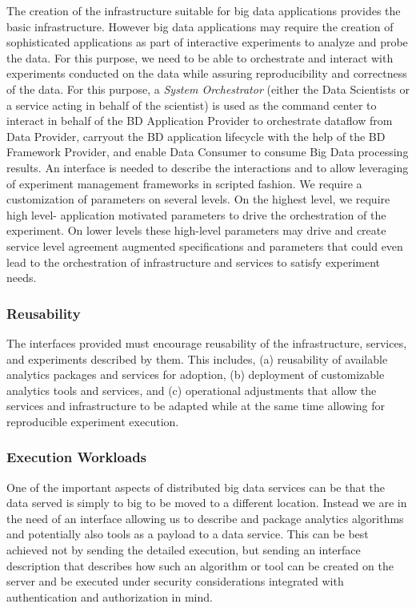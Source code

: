 \documentclass[10pt]{article}
\begin{document}
The creation of the infrastructure suitable for big data applications
provides the basic infrastructure. However big data applications may
require the creation of sophisticated applications as part of
interactive experiments to analyze and probe the data. For this
purpose, we need to be able to orchestrate and interact with
experiments conducted on the data while assuring reproducibility and
correctness of the data. For this purpose, a {\it System Orchestrator}
(either the Data Scientists or a service acting in behalf of the
scientist) is used as the command center to interact in behalf of the
BD Application Provider to orchestrate dataflow from Data Provider,
carryout the BD application lifecycle with the help of the BD
Framework Provider, and enable Data Consumer to consume Big Data
processing results. An interface is needed to describe the
interactions and to allow leveraging of experiment management
frameworks in scripted fashion. We require a customization of
parameters on several levels. On the highest level, we require high
level- application motivated parameters to drive the orchestration of
the experiment. On lower levels these high-level parameters may drive
and create service level agreement augmented specifications and
parameters that could even lead to the orchestration of infrastructure
and services to satisfy experiment needs.

\subsubsection{Reusability}

The interfaces provided must encourage reusability of the
infrastructure, services, and experiments described by them. This
includes, (a) reusability of available analytics packages and services
for adoption, (b) deployment of customizable analytics tools and
services, and (c) operational adjustments that allow the services and
infrastructure to be adapted while at the same time allowing for
reproducible experiment execution.

\subsubsection{Execution Workloads}

One of the important aspects of distributed big data services can be
that the data served is simply to big to be moved to a different
location. Instead we are in the need of an interface allowing us to
describe and package analytics algorithms and potentially also tools
as a payload to a data service. This can be best achieved not by
sending the detailed execution, but sending an interface description
that describes how such an algorithm or tool can be created on the
server and be executed under security considerations integrated
with authentication and authorization in mind.
\end{document}
